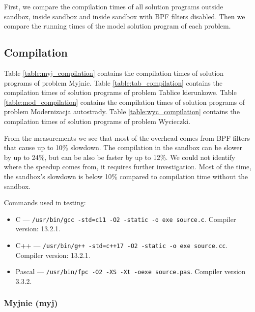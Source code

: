 \documentclass[en]{pracamgr}
\begin{document}
First, we compare the compilation times of all solution programs outside sandbox, inside sandbox and inside sandbox with BPF filters disabled. Then we compare the running times of the model solution program of each problem.

\subsection{Compilation}

Table \ref{table:myj_compilation} contains the compilation times of solution programs of problem Myjnie.
Table \ref{table:tab_compilation} contains the compilation times of solution programs of problem Tablice kierunkowe.
Table \ref{table:mod_compilation} contains the compilation times of solution programs of problem Modernizacja autostrady.
Table \ref{table:wyc_compilation} contains the compilation times of solution programs of problem Wycieczki.

From the measurements we see that most of the overhead comes from BPF filters that cause up to 10\% slowdown. The compilation in the sandbox can be slower by up to 24\%, but can be also be faster by up to 12\%. We could not identify where the speedup comes from, it requires further investigation. Most of the time, the sandbox's slowdown is below 10\% compared to compilation time without the sandbox.

Commands used in testing:
\begin{itemize}
    \item C --- \texttt{/usr/bin/gcc -std=c11 -O2 -static -o exe source.c}. Compiler version: 13.2.1.
    \item C++ --- \texttt{/usr/bin/g++ -std=c++17 -O2 -static -o exe source.cc}. Compiler version: 13.2.1.
    \item Pascal --- \texttt{/usr/bin/fpc -O2 -XS -Xt -oexe source.pas}. Compiler version 3.3.2.
\end{itemize}

\newpage

\subsubsection{Myjnie (myj)}
\end{document}
